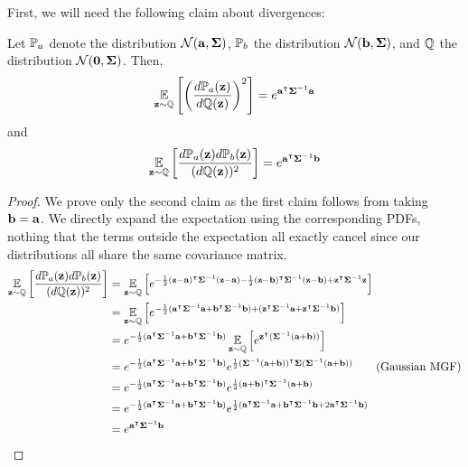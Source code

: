 First, we will need the following claim about divergences:
\begin{lemma}
\label{lem:gaussian-chi-squared-divergence}
Let \(\bbP_a\) denote the distribution \(\cN(\va,\mSigma)\), \(\bbP_b\) the distribution \(\cN(\vb,\mSigma)\), and \(\bbQ\) the distribution \(\cN(\vec0,\mSigma)\).
Then,
\[
    \E_{\vz\sim\bbQ}\left[
        \left(\frac{d\bbP_a(\vz)}{d\bbQ(\vz)}\right)^2
    \right]
    = e^{\va^\intercal\mSigma^{-1}\va}
\]
and
\[
    \E_{\vz\sim\bbQ}\left[
        \frac{d\bbP_a(\vz) d\bbP_b(\vz)}{(d\bbQ(\vz))^2}
    \right]
    = e^{\va^\intercal\mSigma^{-1}\vb}
\]
\end{lemma}
\begin{proof}
We prove only the second claim as the first claim follows from taking \(\vb=\va\).
We directly expand the expectation using the corresponding PDFs, nothing that the terms outside the expectation all exactly cancel since our distributions all share the same covariance matrix.
\begin{align*}
    \E_{\vz\sim\bbQ}\left[
        \frac{d\bbP_a(\vz) d\bbP_b(\vz)}{(d\bbQ(\vz))^2}
    \right]
    &= \E_{\vz\sim\bbQ}\left[
        e^{
            -\frac12(\vz-\va)^\intercal\mSigma^{-1}(\vz-\va)
            -\frac12(\vz-\vb)^\intercal\mSigma^{-1}(\vz-\vb)
            + \vz^\intercal\mSigma^{-1}\vz
        }
    \right] \\
    &= \E_{\vz\sim\bbQ}\left[
        e^{
            -\frac12(\va^\intercal\mSigma^{-1}\va
            +\vb^\intercal\mSigma^{-1}\vb)
            +(\vz^\intercal\mSigma^{-1}\va
            +\vz^\intercal\mSigma^{-1}\vb)
        }
    \right] \\
    &= e^{
            -\frac12(\va^\intercal\mSigma^{-1}\va
            +\vb^\intercal\mSigma^{-1}\vb)
        }
        \E_{\vz\sim\bbQ}\left[
        e^{
            \vz^\intercal(\mSigma^{-1}(\va+\vb))
        }
    \right] \\
    &= e^{
            -\frac12(\va^\intercal\mSigma^{-1}\va
            +\vb^\intercal\mSigma^{-1}\vb)
        }
        e^{
            \frac12
            (\mSigma^{-1}(\va+\vb))^\intercal
            \mSigma
            (\mSigma^{-1}(\va+\vb))
        } \tag{Gaussian MGF}\\
    &= e^{
            -\frac12(\va^\intercal\mSigma^{-1}\va
            +\vb^\intercal\mSigma^{-1}\vb)
        }
        e^{
            \frac12
            (\va+\vb)^\intercal
            \mSigma^{-1}
            (\va+\vb)
        } \\
    &= e^{
            -\frac12(\va^\intercal\mSigma^{-1}\va
            +\vb^\intercal\mSigma^{-1}\vb)
        }
        e^{
            \frac12
            (
            \va^\intercal\mSigma^{-1}\va
            + \vb^\intercal\mSigma^{-1}\vb
            + 2\va^\intercal\mSigma^{-1}\vb
            )
        } \\
    &= e^{
            \va^\intercal\mSigma^{-1}\vb
        }
\end{align*}
\end{proof}

